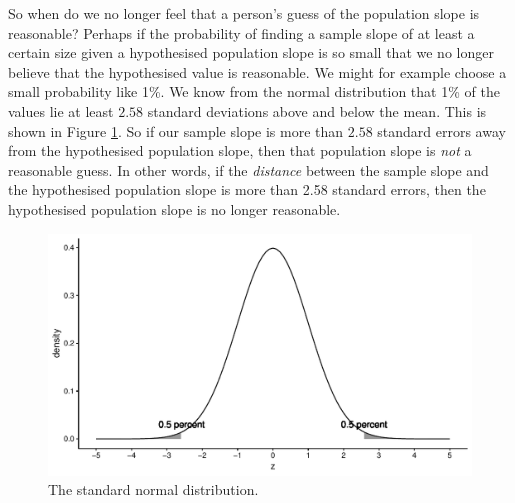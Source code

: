 \documentclass[]{book}\usepackage[]{graphicx}\usepackage[]{color}
\makeatletter
\def\maxwidth{ %
  \ifdim\Gin@nat@width>\linewidth
    \linewidth
  \else
    \Gin@nat@width
  \fi
}
\newenvironment{knitrout}{}{} %
\makeatother
\begin{document}
So when do we no longer feel that a person's guess of the population slope is reasonable? Perhaps if the probability of finding a sample slope of at least a certain size given a hypothesised population slope is so small that we no longer believe that the hypothesised value is reasonable. We might for example choose a small probability like 1\%. We know from the normal distribution that 1\% of the values lie at least $2.58$ standard deviations above and below the mean. This is shown in Figure \ref{fig:normal_2z}. So if our sample slope is more than $2.58$ standard errors away from the hypothesised population slope, then that population slope is \textit{not} a reasonable guess. In other words, if the \textit{distance} between the sample slope and the hypothesised population slope is more than 2.58 standard errors, then the hypothesised population slope is no longer reasonable.

\begin{knitrout}
\color{fgcolor}\begin{figure}

{\centering \includegraphics[width=\maxwidth]{figure/normal_2z-1} 

}

\caption[The standard normal distribution]{The standard normal distribution.}\label{fig:normal_2z}
\end{figure}


\end{knitrout}
\end{document}

